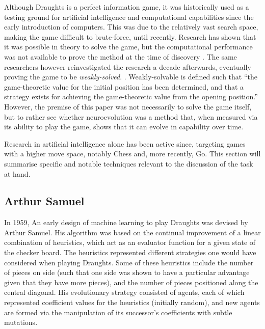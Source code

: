 \documentclass[12pt,a4paper]{article}
\begin{document}
        Although Draughts is a perfect information game, it was historically used as a testing ground for artificial intelligence and computational capabilities since the early introduction of computers. This was due to the relatively vast search space, making the game difficult to brute-force, until recently. Research has shown that it was possible in theory to solve the game, but the computational performance was not available to prove the method at the time of discovery \cite{schaeffer_solving_1996}. The same researchers however reinvestigated the research a decade afterwards, eventually proving the game to be \emph{weakly-solved}. \cite{schaeffer_checkers_2007}. Weakly-solvable is defined such that ``the game-theoretic value for the initial position has been determined, and that a strategy exists for achieving the game-theoretic value from the opening position.'' \cite{allis_searching_1994} However, the premise of this paper was not necessarily to solve the game itself, but to rather see whether neuroevolution was a method that, when measured via its ability to play the game, shows that it can evolve in capability over time.

        Research in artificial intelligence alone has been active since, targeting games with a higher move space, notably Chess and, more recently, Go. This section will summarise specific and notable techniques relevant to the discussion of the task at hand.

    \subsection{Arthur Samuel}
        In 1959, An early design of machine learning to play Draughts was devised by Arthur Samuel\cite{samuel_studies_1959}. His algorithm was based on the continual improvement of a linear combination of heuristics, which act as an evaluator function for a given state of the checker board. The heuristics represented different strategies one would have considered when playing Draughts. Some of these heuristics include the number of pieces on side (such that one side was shown to have a particular advantage given that they have more pieces), and the number of pieces positioned along the central diagonal. His evolutionary strategy consisted of agents, each of which represented coefficient values for the heuristics (initially random), and new agents are formed via the manipulation of its successor's coefficients with subtle mutations.
        
        
\end{document}

